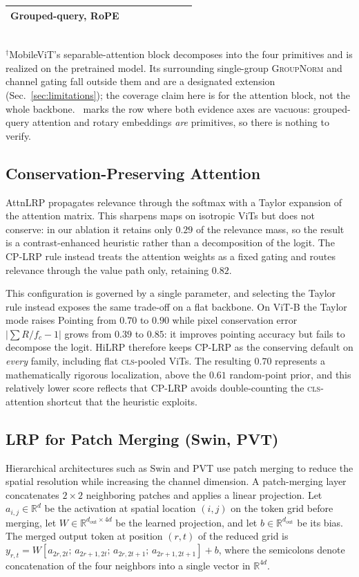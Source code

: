 \documentclass[lettersize,journal]{IEEEtran}
\theoremstyle{definition}
\theoremstyle{plain}
\newcommand{\cmark}{\ding{51}}
\newcommand{\nd}{\textemdash}            %
\begin{document}
\begin{table}[!tbp]
\begin{tabular}{@{}l cccc c cc@{}}
    Grouped-query, RoPE        & \cmark &        &        & \cmark & & \nd    & \nd    \\
    \bottomrule
  \end{tabular}
  \\[3pt]
  \footnotesize{$^{\dagger}$MobileViT's separable-attention block decomposes into the four primitives and is realized on the pretrained model. Its surrounding single-group \textsc{GroupNorm} and channel gating fall outside them and are a designated extension (Sec.~\ref{sec:limitations}); the coverage claim here is for the attention block, not the whole backbone. \nd\ marks the row where both evidence axes are vacuous: grouped-query attention and rotary embeddings \emph{are} primitives, so there is nothing to verify.}
\end{table}

\subsection{Conservation-Preserving Attention}
\label{sec:cp}
AttnLRP propagates relevance through the softmax with a Taylor expansion of the attention matrix. This sharpens maps on isotropic ViTs but does not conserve: in our ablation it retains only $0.29$ 
of the relevance mass, so the result is a contrast-enhanced heuristic rather than a decomposition of the logit. The CP-LRP rule instead treats the attention weights as a fixed gating and routes relevance through the value path only, retaining $0.82$.

This configuration is governed by a single parameter, and selecting the Taylor rule instead exposes the same trade-off on a flat backbone. On ViT-B the Taylor mode raises Pointing from $0.70$ to $0.90$ while pixel conservation error $\lvert\sum R/f_c-1\rvert$ grows from $0.39$ to $0.85$: it improves pointing accuracy but fails to decompose the logit. HiLRP therefore keeps CP-LRP as the conserving default on \emph{every} family, including flat \textsc{cls}-pooled ViTs. The resulting $0.70$ represents a mathematically rigorous localization, above the $0.61$ random-point prior, and this relatively lower score reflects that CP-LRP avoids double-counting the \textsc{cls}-attention shortcut that the heuristic exploits.

\subsection{LRP for Patch Merging (Swin, PVT)}
Hierarchical architectures such as Swin and PVT use patch merging to reduce the spatial resolution while increasing the channel dimension. A patch-merging layer concatenates $2 \times 2$ neighboring patches and applies a linear projection. Let $a_{i,j}\in\mathbb{R}^{d}$ be the activation at spatial location $(i,j)$ on the token grid before
merging, let $W\in\mathbb{R}^{d_{\mathrm{out}}\times 4d}$ be the learned projection, and let $b\in\mathbb{R}^{d_{\mathrm{out}}}$ be its bias. The merged output token at position $(r,t)$ of the reduced grid is $y_{r,t} = W [a_{2r, 2t};\, a_{2r+1, 2t};\, a_{2r, 2t+1};\, a_{2r+1, 2t+1}] + b$, where the semicolons denote concatenation of the four neighbors into a single vector in $\mathbb{R}^{4d}$.
\end{document}
